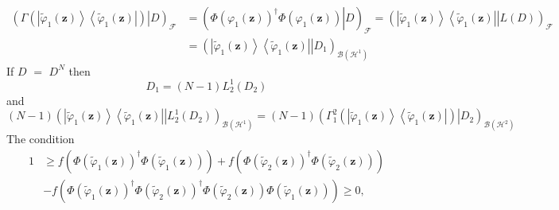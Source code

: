 \documentclass[aps,preprint]{revtex4}%
\begin{document}
\begin{align}
\left(  \left.  \Gamma\left(  \left\vert \tilde{\varphi}_{1}\left(
\mathbf{z}\right)  \right\rangle \left\langle \tilde{\varphi}_{1}\left(
\mathbf{z}\right)  \right\vert \right)  \right\vert D\right)  _{\mathcal{F}}
&  =\left(  \left.  \Phi\left(  \varphi_{1}\left(  \mathbf{z}\right)  \right)
^{\dagger}\Phi\left(  \varphi_{1}\left(  \mathbf{z}\right)  \right)
\right\vert D\right)  _{\mathcal{F}}=\left(  \left.  \left\vert \tilde
{\varphi}_{1}\left(  \mathbf{z}\right)  \right\rangle \left\langle
\tilde{\varphi}_{1}\left(  \mathbf{z}\right)  \right\vert \right\vert L\left(
D\right)  \right)  _{\mathcal{F}}\nonumber\\
&  =\left(  \left.  \left\vert \tilde{\varphi}_{1}\left(  \mathbf{z}\right)
\right\rangle \left\langle \tilde{\varphi}_{1}\left(  \mathbf{z}\right)
\right\vert \right\vert D_{1}\right)  _{\mathcal{B}\left(  \mathcal{H}%
^{1}\right)  }%
\end{align}
If $D$ $=$ $D^{N}$ then
\begin{equation}
D_{1}=\left(  N-1\right)  L_{2}^{1}\left(  D_{2}\right)
\end{equation}
and
\begin{equation}
\left(  N-1\right)  \left(  \left.  \left\vert \tilde{\varphi}_{1}\left(
\mathbf{z}\right)  \right\rangle \left\langle \tilde{\varphi}_{1}\left(
\mathbf{z}\right)  \right\vert \right\vert L_{2}^{1}\left(  D_{2}\right)
\right)  _{\mathcal{B}\left(  \mathcal{H}^{1}\right)  }=\left(  N-1\right)
\left(  \left.  \Gamma_{1}^{2}\left(  \left\vert \tilde{\varphi}_{1}\left(
\mathbf{z}\right)  \right\rangle \left\langle \tilde{\varphi}_{1}\left(
\mathbf{z}\right)  \right\vert \right)  \right\vert D_{2}\right)
_{\mathcal{B}\left(  \mathcal{H}^{2}\right)  }%
\end{equation}
The condition
\begin{align}
1  &  \geq f\left(  \Phi\left(  \tilde{\varphi}_{1}\left(  \mathbf{z}\right)
\right)  ^{\dagger}\Phi\left(  \tilde{\varphi}_{1}\left(  \mathbf{z}\right)
\right)  \right)  +f\left(  \Phi\left(  \tilde{\varphi}_{2}\left(
\mathbf{z}\right)  \right)  ^{\dagger}\Phi\left(  \tilde{\varphi}_{2}\left(
\mathbf{z}\right)  \right)  \right) \nonumber\\
&  \left.  -\right.  f\left(  \Phi\left(  \tilde{\varphi}_{1}\left(
\mathbf{z}\right)  \right)  ^{\dagger}\Phi\left(  \tilde{\varphi}_{2}\left(
\mathbf{z}\right)  \right)  ^{\dagger}\Phi\left(  \tilde{\varphi}_{2}\left(
\mathbf{z}\right)  \right)  \Phi\left(  \tilde{\varphi}_{1}\left(
\mathbf{z}\right)  \right)  \right)  \geq0,
\end{align}
\end{document}
